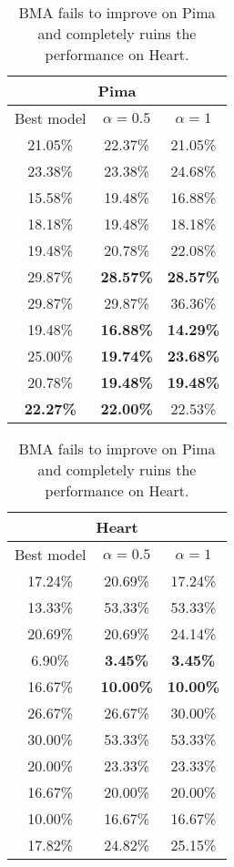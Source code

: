 


\begin{table} [!t]
\caption{BMA fails to improve on Pima and completely ruins the performance on Heart.}

\begin{minipage}{0.5\textwidth}
      \centering
          \begin{tabular}{|c | c | c | }
      \hline
      \multicolumn{3}{|c|}{Pima}  \\
      \hline
      Best model & $ \alpha = 0.5 $ & $ \alpha = 1 $ \\  \hline
      21.05\% & 	{22.37\%} & 	{21.05\%}   \\
      23.38\% & 	{23.38\%} & 	{24.68\%}  \\
      15.58\% & 	{19.48\%} & 	{16.88\%}  \\
      18.18\% & 	{19.48\%} & 	{18.18\%}  \\
      19.48\% & 	{20.78\%} & 	{22.08\%}  \\
      29.87\% & 	\textbf{28.57\%} & 	\textbf{28.57\%}  \\
      29.87\% & 	{29.87\%} & 	{36.36\%}  \\
      19.48\% & 	\textbf{16.88\%} & 	\textbf{14.29\%}  \\
      25.00\% & 	\textbf{19.74\%} & 	\textbf{23.68\%}  \\
      20.78\% & 	\textbf{19.48\%} & 	\textbf{19.48\%}  \\ \hline 
       \textbf{22.27\%} & 	 \textbf{22.00\%} & 	 {22.53\%} \\

      \hline 
      \end{tabular}

\end{minipage}%
\begin{minipage}{0.5\textwidth}
      \centering
           \begin{tabular}{|c | c | c | }
      \hline
      \multicolumn{3}{|c|}{Heart}  \\
      \hline
      Best model & $ \alpha = 0.5 $ & $ \alpha = 1 $ \\  \hline
	17.24\% & 	20.69\% & 	17.24\% \\ 
	13.33\% & 	53.33\% & 	53.33\% \\ 
	20.69\% & 	20.69\% & 	24.14\% \\ 
	6.90\% & 	\textbf{3.45\% } &   \textbf{3.45\%}  \\ 
	16.67\% & 	\textbf{10.00\%}  & 	\textbf{10.00\%} \\ 
	26.67\% & 	26.67\% & 	30.00\% \\ 
	30.00\% & 	53.33\% & 	53.33\% \\ 
	20.00\% & 	23.33\% & 	23.33\% \\ 
	16.67\% & 	20.00\% & 	20.00\% \\ 
	10.00\% & 	16.67\% & 	16.67\% \\ \hline 
	 17.82\% & 	 24.82\% & 	 25.15\% \\
  

\end{tabular}
\end{minipage}
\end{table}
